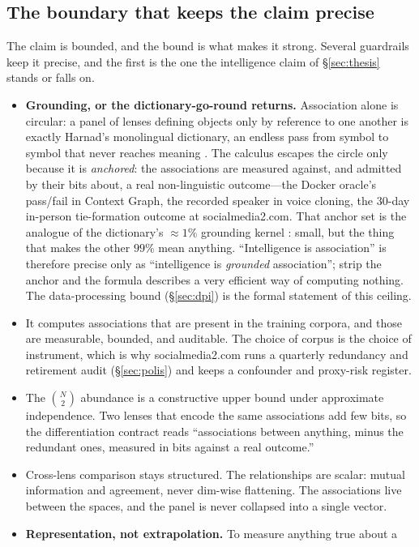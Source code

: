 \documentclass[10pt,twocolumn]{article}
\begin{document}
\subsection{The boundary that keeps the claim precise}
\label{sec:reframe-honest}
The claim is bounded, and the bound is what makes it strong. Several guardrails
keep it precise, and the first is the one the intelligence claim of
\S\ref{sec:thesis} stands or falls on.
\begin{itemize}\itemsep0.12em
\item \textbf{Grounding, or the dictionary-go-round returns.} Association alone is
circular: a panel of lenses defining objects only by reference to one another is
exactly Harnad's monolingual dictionary, an endless pass from symbol to symbol
that never reaches meaning \citep{harnad1990symbol}. The calculus escapes the
circle only because it is \emph{anchored}: the associations are measured against,
and admitted by their bits about, a real non-linguistic outcome---the Docker
oracle's pass/fail in Context Graph, the recorded speaker in voice cloning, the
$30$-day in-person tie-formation outcome at socialmedia2.com. That anchor set is the
analogue of the dictionary's $\approx 1\%$ grounding kernel
\citep{vincentlamarre2016latent}: small, but the thing that makes the other $99\%$
mean anything. ``Intelligence is association'' is therefore precise only as
``intelligence is \emph{grounded} association''; strip the anchor and the formula
describes a very efficient way of computing nothing. The data-processing bound
(\S\ref{sec:dpi}) is the formal statement of this ceiling.
\item It computes associations that are present in the training corpora, and
those are measurable, bounded, and auditable. The choice of corpus is the choice
of instrument, which is why socialmedia2.com runs a quarterly redundancy and retirement
audit (\S\ref{sec:polis}) and keeps a confounder and proxy-risk register.
\item The $\binom{N}{2}$ abundance is a constructive upper bound under
approximate independence. Two lenses that encode the same associations add few
bits, so the differentiation contract reads ``associations between anything,
minus the redundant ones, measured in bits against a real outcome.''
\item Cross-lens comparison stays structured. The relationships are scalar:
mutual information and agreement, never dim-wise flattening. The associations live
between the spaces, and the panel is never collapsed into a single vector.
\item \textbf{Representation, not extrapolation.} To measure anything true about a

\end{itemize}
\end{document}
